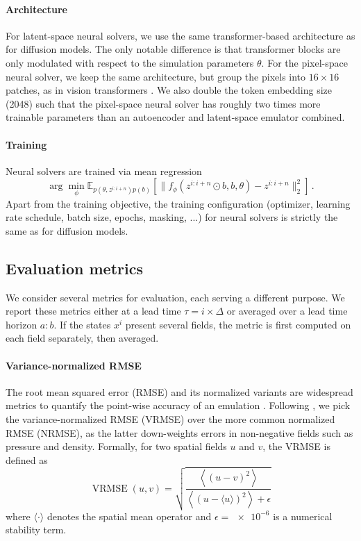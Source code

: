 \paragraph{Architecture} For latent-space neural solvers, we use the same transformer-based architecture as for diffusion models. The only notable difference is that transformer blocks are only modulated with respect to the simulation parameters $\theta$. For the pixel-space neural solver, we keep the same architecture, but group the pixels into $16 \times 16$ patches, as in vision transformers \cite{dosovitskiy2021image}. We also double the token embedding size (2048) such that the pixel-space neural solver has roughly two times more trainable parameters than an autoencoder and latent-space emulator combined.

\paragraph{Training} Neural solvers are trained via mean regression
\begin{equation}
    \arg\min_\phi \mathbb{E}_{p(\theta, z^{i:i+n}) p(b)} \left[ \big\| f_\phi(z^{i:i+n} \odot b, b, \theta) - z^{i:i+n} \big\|_2^2 \right] \, .
\end{equation}
Apart from the training objective, the training configuration (optimizer, learning rate schedule, batch size, epochs, masking, ...) for neural solvers is strictly the same as for diffusion models.

\subsection{Evaluation metrics}

We consider several metrics for evaluation, each serving a different purpose. We report these metrics either at a lead time $\tau = i \times \Delta$ or averaged over a lead time horizon $a\!:\!b$. If the states $x^i$ present several fields, the metric is first computed on each field separately, then averaged.

\paragraph{Variance-normalized RMSE} The root mean squared error (RMSE) and its normalized variants are widespread metrics to quantify the point-wise accuracy of an emulation \cite{fortin2014why, mccabe2023stability, ohana2024well}. Following \textcite{ohana2024well}, we pick the variance-normalized RMSE (VRMSE) over the more common normalized RMSE (NRMSE), as the latter down-weights errors in non-negative fields such as pressure and density. Formally, for two spatial fields $u$ and $v$, the VRMSE is defined as
\begin{equation} \label{eq:lola-vrmse}
    \operatorname{VRMSE}(u, v) = \sqrt{\frac{\left\langle (u - v)^2 \right\rangle}{\left\langle (u - \langle u \rangle)^2 \right\rangle + \epsilon}}
\end{equation}
where $\langle \cdot \rangle$ denotes the spatial mean operator and $\epsilon = \num{e-6}$ is a numerical stability term.

